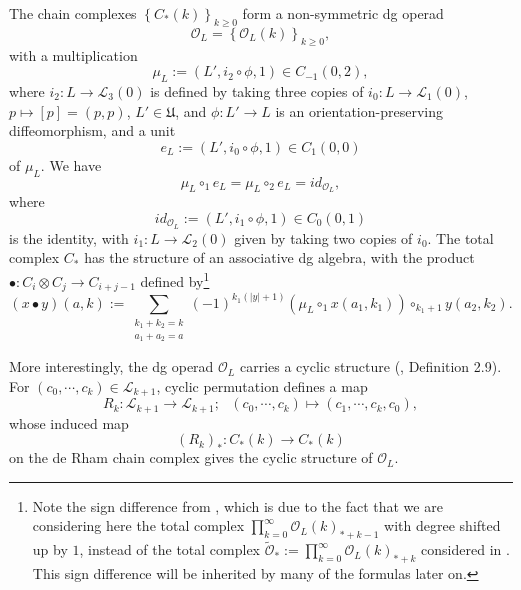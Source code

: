 \documentclass[a4paper]{article}
\numberwithin{equation}{section}
\begin{document}
The chain complexes $\left\{C_\ast(k)\right\}_{k\geq0}$ form a non-symmetric dg operad
\begin{equation}
\mathcal{O}_L=\left\{\mathcal{O}_L(k)\right\}_{k\geq0},
\end{equation} 
with a multiplication
\begin{equation}
\mu_L:=(L',i_2\circ\phi,1)\in C_{-1}(0,2),
\end{equation}
where $i_2:L\rightarrow\mathcal{L}_3(0)$ is defined by taking three copies of $i_0:L\rightarrow\mathcal{L}_1(0)$, $p\mapsto[p]=(p,p)$, $L'\in\mathfrak{U}$, and $\phi:L'\rightarrow L$ is an orientation-preserving diffeomorphism, and a unit
\begin{equation} 
e_L:=(L',i_0\circ\phi,1)\in C_1(0,0)
\end{equation}
of $\mu_L$. We have
\begin{equation}
\mu_L\circ_1e_L=\mu_L\circ_2e_L=\mathit{id}_{\mathcal{O}_L},
\end{equation}
where
\begin{equation}
\mathit{id}_{\mathcal{O}_L}:=(L',i_1\circ\phi,1)\in C_0(0,1)
\end{equation}
is the identity, with $i_1:L\rightarrow\mathcal{L}_2(0)$ given by taking two copies of $i_0$. The total complex $C_\ast$ has the structure of an associative dg algebra, with the product $\bullet:C_i\otimes C_j\rightarrow C_{i+j-1}$ defined by\footnote{Note the sign difference from \cite{ki1}, which is due to the fact that we are considering here the total complex $\prod_{k=0}^\infty\mathcal{O}_L(k)_{\ast+k-1}$ with degree shifted up by $1$, instead of the total complex $\widetilde{\mathcal{O}}_\ast:=\prod_{k=0}^\infty\mathcal{O}_L(k)_{\ast+k}$ considered in \cite{ki1}. This sign difference will be inherited by many of the formulas later on.}
\begin{equation}\label{eq:bullet}
(x\bullet y)(a,k):=\sum_{\substack{k_1+k_2=k\\a_1+a_2=a}}(-1)^{k_1(|y|+1)}(\mu_L\circ_1 x(a_1,k_1))\circ_{k_1+1}y(a_2,k_2).
\end{equation}

More interestingly, the dg operad $\mathcal{O}_L$ carries a cyclic structure (\cite{ki1}, Definition 2.9). For $(c_0,\cdots,c_k)\in\mathcal{L}_{k+1}$, cyclic permutation defines a map
\begin{equation}\label{eq:rotation}
R_k:\mathcal{L}_{k+1}\rightarrow\mathcal{L}_{k+1};\textrm{ } (c_0,\cdots,c_k)\mapsto(c_1,\cdots,c_k,c_0),
\end{equation}
whose induced map
\begin{equation}
(R_k)_\ast:C_\ast(k)\rightarrow C_\ast(k)
\end{equation}
on the de Rham chain complex gives the cyclic structure of $\mathcal{O}_L$.
\end{document}
